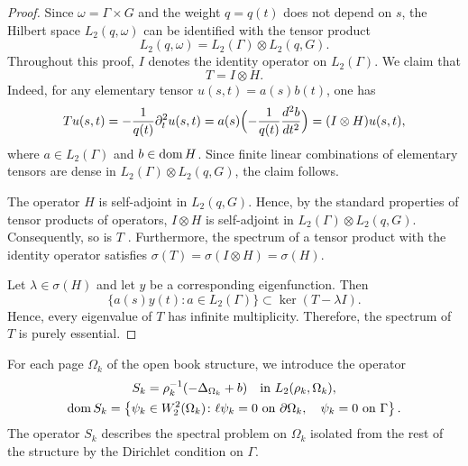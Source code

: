 \documentclass[reqno]{amsart}
\theoremstyle{definition}
\theoremstyle{remark}
\numberwithin{equation}{section}
\newcommand{\dmn}{\mathop{\rm dom}}
\begin{document}
\begin{proof}
Since $\omega=\Gamma\times G$ and the weight $q=q(t)$ does not depend on $s$, the Hilbert space $L_2(q,\omega)$ can be identified with the tensor product \begin{equation*}
L_2(q,\omega)=L_2(\Gamma)\otimes L_2(q,G).
\end{equation*}
Throughout this proof, $I$ denotes the identity operator on $L_2(\Gamma)$. We claim that
\begin{equation*}
T=I\otimes H.
\end{equation*}
Indeed, for any elementary tensor $u(s,t)=a(s)b(t)$, one has
\begin{equation*}
    Tu(s,t)=-\frac1{q(t)}\partial_t^2u(s,t)=a(s)\Bigl(-\frac1{q(t)}\frac{d^2 b}{dt^2}\Bigr)=(I\otimes H)u(s,t),
\end{equation*}
where $a\in L_2(\Gamma)$ and $b\in\dmn H$. Since finite linear combinations of elementary tensors are dense in $L_2(\Gamma)\otimes L_2(q,G)$, the claim follows.

The operator $H$ is self-adjoint in $L_2(q,G)$. Hence, by the standard properties of tensor products of operators, $I\otimes H$ is self-adjoint in
$L_2(\Gamma)\otimes L_2(q,G)$. Consequently, so is $T$ \cite[VIII.10]{ReedSimonI}. Furthermore, the spectrum of a tensor product with the identity operator satisfies
$\sigma(T) = \sigma(I\otimes H) = \sigma(H)$.

Let $\lambda\in\sigma(H)$ and let $y$ be a corresponding eigenfunction. Then
\begin{equation*}
\{a(s)y(t)\colon a\in L_2(\Gamma)\}\subset\ker(T-\lambda I).
\end{equation*}
Hence, every eigenvalue of $T$ has infinite multiplicity. Therefore, the spectrum of $T$ is purely essential.
\end{proof}




For each page $\Omega_k$ of the open book structure, we introduce the operator
\begin{multline*}
  S_k=\rho^{-1}_k(-\Delta_{\Omega_k}+b) \quad\text{in }L_2(\rho_k,\Omega_k),\\
  \dmn S_k=\left\{\psi_k\in W_2^2(\Omega_k)\colon \ell\psi_k=0 \text{ on }\partial\Omega_k,\quad  \psi_k=0 \text{ on }\Gamma \right\}.
\end{multline*} 
The operator $S_k$ describes the spectral problem on $\Omega_k$ isolated from the rest of the structure by the Dirichlet condition on $\Gamma$.
\end{document}
